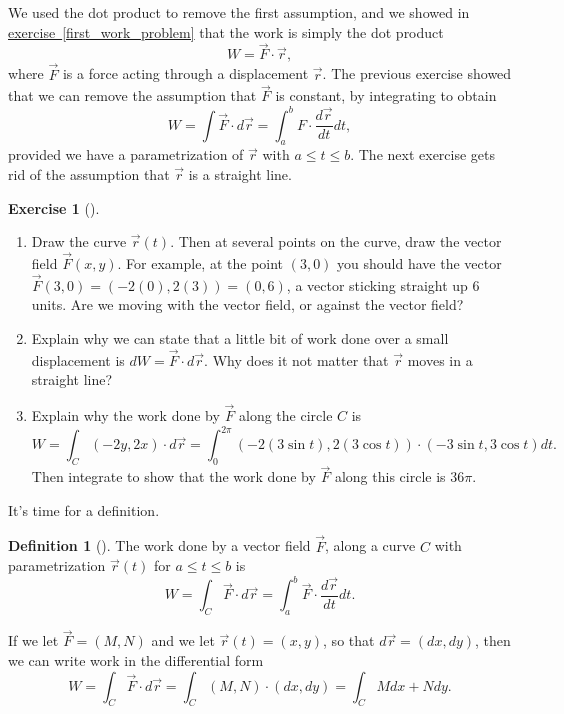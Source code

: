\documentclass[10pt,]{book}
\theoremstyle{plain}
\theoremstyle{definition}
\newtheorem{definition}[theorem]{Definition}
\theoremstyle{definition}
\theoremstyle{definition}
\theoremstyle{definition}
\newtheorem{exploration}[project]{Exercise}
\theoremstyle{definition}
\numberwithin{equation}{section}
\begin{document}
We used the dot product to remove the first assumption, and we showed in \hyperref[first_work_problem]{exercise~\ref{first_work_problem}} that the work is simply the dot product%
\begin{equation*}
W=\vec F\cdot \vec r,
\end{equation*}
where \(\vec F\) is a force acting through a displacement \(\vec r\). The previous exercise showed that we can remove the assumption that \(\vec F\) is constant, by integrating to obtain%
\begin{equation*}
W=\int \vec F \cdot d\vec r = \int_a^b F\cdot \frac{d\vec r}{dt}dt,
\end{equation*}
provided we have a parametrization of \(\vec r\) with \(a\leq t\leq b\). The next exercise gets rid of the assumption that \(\vec r\) is a straight line.%
\begin{exploration}[]\label{exploration-190}
\leavevmode%
\begin{enumerate}[font=\bfseries,label=(\alph*),ref=\alph*]
\item\label{task-471} Draw the curve \(\vec r(t)\). Then at several points on the curve, draw the vector field \(\vec F(x,y)\).  For example, at the point \((3,0)\) you should have the vector \(\vec F(3,0)=(-2(0),2(3))=(0,6)\), a vector sticking straight up 6 units. Are we moving with the vector field, or against the vector field?%
\item\label{task-472} Explain why we can state that a little bit of work done over a small displacement is \(dW = \vec F\cdot d\vec r\). Why does it not matter that \(\vec r\) moves in a straight line?%
\item\label{task-473} Explain why the work done by \(\vec F\) along the circle \(C\)  is%
\begin{equation*}
W = \int_C\left(-2y,2x\right)\cdot d\vec r
= \int_0^{2\pi}\left(-2(3\sin t),2(3\cos t)\right)\cdot(-3\sin t, 3\cos t)dt.
\end{equation*}
Then integrate to show that the work done by \(\vec F\) along this circle is \(36\pi\).%
\end{enumerate}
\end{exploration}
It's time for a definition.%
\begin{definition}[{}]\label{definition-32}
The work done by a vector field \(\vec F\), along a curve \(C\) with parametrization \(\vec r(t)\) for \(a\leq t\leq b\) is%
\begin{equation*}
W = \int_C \vec F\cdot d\vec r= \int_a^b \vec F\cdot \frac{d\vec r}{dt}dt.
\end{equation*}
%
\par
If we let \(\vec F = (M,N)\) and we let \(\vec r(t)=(x,y)\), so that \(d\vec r = (dx,dy)\), then we can write work in the differential form%
\begin{equation*}
W = \int_C \vec F\cdot d\vec r= \int_C (M,N)\cdot (dx,dy) = \int_C Mdx+Ndy.
\end{equation*}
%
\end{definition}
\end{document}
